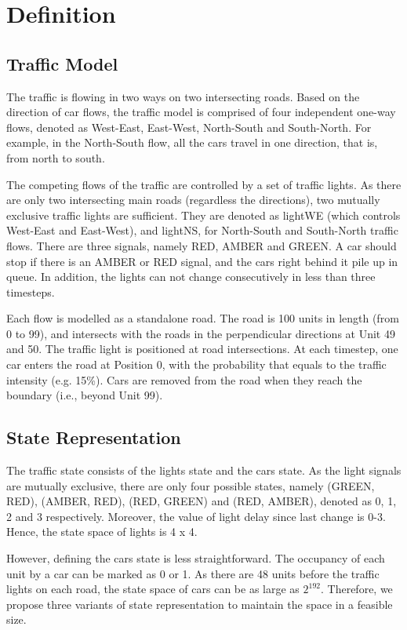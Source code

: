 \section{Definition}

\subsection{Traffic Model}
The traffic is flowing in two ways on two intersecting roads. Based on the direction of car flows, the traffic model is comprised of four independent one-way flows, denoted as West-East, East-West, North-South and South-North. For example, in the North-South flow, all the cars travel in one direction, that is, from north to south.

The competing flows of the traffic are controlled by a set of traffic lights. As there are only two intersecting main roads (regardless the directions), two mutually exclusive traffic lights are sufficient. They are denoted as lightWE (which controls West-East and East-West), and lightNS, for North-South and South-North traffic flows. There are three signals, namely RED, AMBER and GREEN. A car should stop if there is an AMBER or RED signal, and the cars right behind it pile up in queue. In addition, the lights can not change consecutively in less than three timesteps.

Each flow is modelled as a standalone road. The road is 100 units in length (from 0 to 99), and intersects with the roads in the perpendicular directions at Unit 49 and 50. The traffic light is positioned at road intersections. At each timestep, one car enters the road at Position 0, with the probability that equals to the traffic intensity (e.g. 15\%). Cars are removed from the road when they reach the boundary (i.e., beyond Unit 99).

\subsection{State Representation}
The traffic state consists of the lights state and the cars state. As the light signals are mutually exclusive, there are only four possible states, namely (GREEN, RED), (AMBER, RED), (RED, GREEN) and (RED, AMBER), denoted as 0, 1, 2 and 3 respectively. Moreover, the value of light delay since last change is 0-3. Hence, the state space of lights is 4 x 4.

However, defining the cars state is less straightforward. The occupancy of each unit by a car can be marked as 0 or 1. As there are 48 units before the traffic lights on each road, the state space of cars can be as large as $2^{192}$. Therefore, we propose three variants of state representation to maintain the space in a feasible size.


